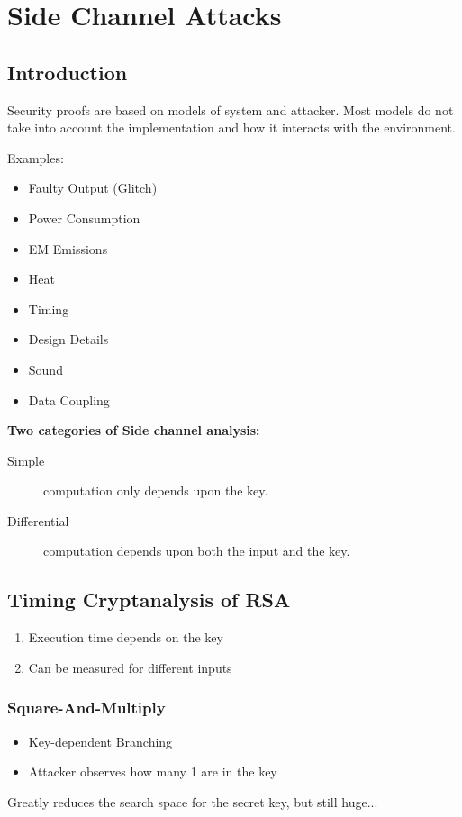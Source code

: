 
\section{Side Channel Attacks}
\subsection{Introduction}
Security proofs are based on models of system and attacker. Most models do not take
into account the implementation and how it interacts with the environment.

Examples:
\begin{itemize}
  \item Faulty Output (Glitch)
  \item Power Consumption
  \item EM Emissions
  \item Heat
  \item Timing
  \item Design Details
  \item Sound
  \item Data Coupling
\end{itemize}

\textbf{Two categories of Side channel analysis:}
\begin{description}
  \item[Simple] computation only depends upon the key.
  \item[Differential] computation depends upon both the input and the key.
\end{description}

\subsection{Timing Cryptanalysis of RSA}
\begin{enumerate}
  \item Execution time depends on the key
  \item Can be measured for different inputs
\end{enumerate}


\subsubsection{Square-And-Multiply}

\begin{itemize}
  \item Key-dependent Branching
  \item Attacker observes how many 1 are in the key
\end{itemize}
Greatly reduces the search space for the secret key, but still huge...

